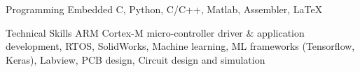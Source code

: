 

\begin{cvskills}

  \cvskill
    {Programming} %
    {Embedded C, Python, C/C++, Matlab, Assembler, \LaTeX} %

  \cvskill
    {Technical Skills} %
    {ARM Cortex-M micro-controller driver \& application development, RTOS, SolidWorks, Machine learning, ML frameworks (Tensorflow, Keras), Labview, PCB design, Circuit design and simulation} %


\end{cvskills}
